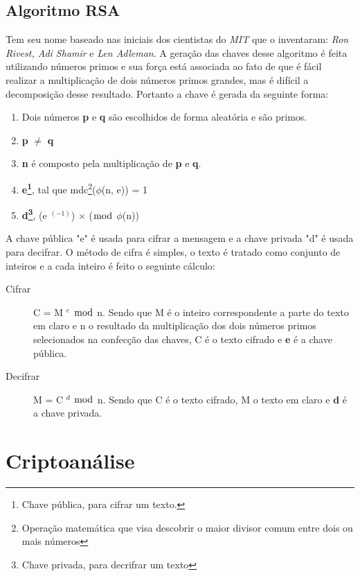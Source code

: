 \subsection{Algoritmo RSA}
\label{algorithm-rsa}

Tem seu nome baseado nas iniciais dos cientistas do \textit{MIT} que o inventaram: \textit{Ron Rivest, Adi Shamir} e \textit{Len Adleman}. A geração das chaves desse algoritmo é feita utilizando números primos e sua força está associada ao fato de que é fácil realizar a multiplicação de dois números primos grandes, mas é difícil a decomposição desse resultado. Portanto a chave é gerada da seguinte forma:

\begin{enumerate}
\item Dois números \textbf{p} e \textbf{q} são escolhidos de forma aleatória e são primos.
\item \textbf{p} $\neq$ \textbf{q}
\item \textbf{n} é composto pela multiplicação de \textbf{p} e \textbf{q}.
\item \textbf{e\footnote{Chave pública, para cifrar um texto.}}, tal que mdc\footnote{Operação matemática que visa descobrir o maior divisor comum entre dois ou mais números}($\phi$(n, e)) = 1
\item \textbf{d\footnote{Chave privada, para decrifrar um texto }}, (e $^ {(-1)}$) $\times$ ($\bmod$ $\phi$(n)) 
\end{enumerate}

%
A chave pública "e"  é usada para cifrar a mensagem e a chave privada "d" é usada para decifrar. O método de cifra é simples, o texto é tratado como conjunto de inteiros e a cada inteiro é feito o seguinte cálculo:

\begin{description}
\item [Cifrar]
C = M $^ e$ $\bmod$ n. Sendo que M é o inteiro correspondente a parte do texto em claro e n o resultado da multiplicação dos dois números primos selecionados na confecção  das chaves, C é o texto cifrado e \textbf{e} é a chave pública. 
\item [Decifrar]
M = C $^ d$ $\bmod$ n. Sendo que C é o texto cifrado, M o texto em claro e \textbf{d} é a chave privada.
\end{description}

%
\section{Criptoanálise}
\label{cryptanalysis}

